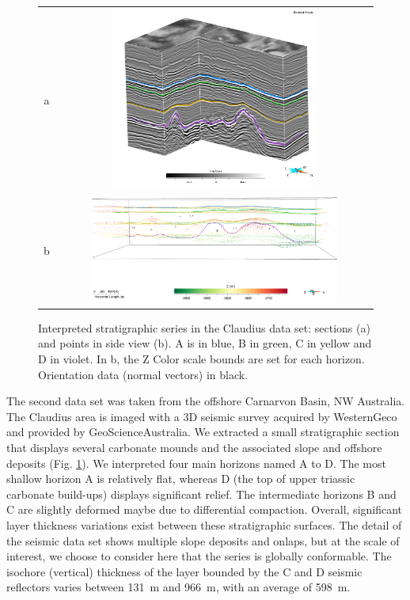\documentclass[final]{ring20}
\begin{document}
{\begin{figure}
\centering\begin{tabular}{cc}
a & \includegraphics[width=0.7\textwidth,height=6cm]{Claudius}\\
b & \includegraphics[width=0.8\textwidth]{Claudius1} \\
\end{tabular}
\caption{Interpreted stratigraphic series in the Claudius data set: sections (a) and points in side view (b). A is in blue, B in green, C in yellow and D in violet. In b, the Z Color scale bounds are set for each horizon. Orientation data (normal vectors) in black.}
\label{fig:ClaudiusData}
\end{figure}

The second data set was taken from the offshore Carnarvon Basin, NW Australia. The Claudius area is imaged with a 3D seismic survey acquired by WesternGeco and provided by GeoScienceAustralia. We extracted a small stratigraphic section that displays several carbonate mounds and the associated slope and offshore deposits (Fig. \ref{fig:ClaudiusData}). We interpreted four main horizons named A to D. The most shallow horizon A is relatively flat, whereas D (the top of upper triassic carbonate build-ups) displays significant relief. The intermediate horizons B and C are slightly deformed maybe due to differential compaction. Overall, significant layer thickness variations exist between these stratigraphic surfaces. The detail of the seismic data set shows multiple slope deposits and onlaps, but at the scale of interest, we choose to consider here that the series is globally conformable. The isochore (vertical) thickness of the layer bounded by the C and D seismic reflectors varies between 131~m and 966~m, with an average of 598~m. 

}
\end{document}
